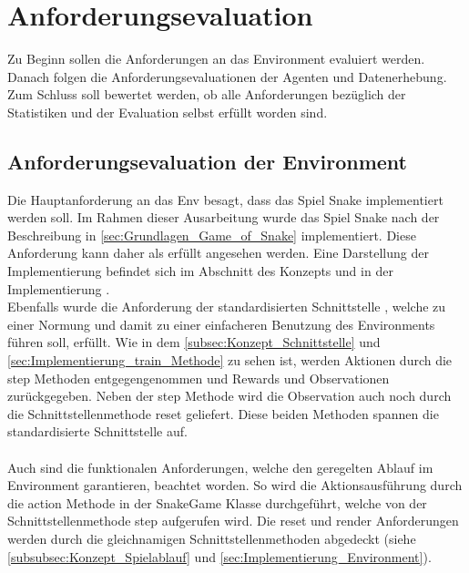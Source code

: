 \section{Anforderungsevaluation}
Zu Beginn sollen die Anforderungen an das Environment evaluiert werden. Danach folgen die Anforderungsevaluationen der Agenten und Datenerhebung. Zum Schluss soll bewertet werden, ob alle Anforderungen bezüglich der Statistiken und der Evaluation selbst erfüllt worden sind.

\subsection{Anforderungsevaluation der Environment}
Die Hauptanforderung an das Env besagt, dass das Spiel Snake implementiert werden soll. Im Rahmen dieser Ausarbeitung wurde das Spiel Snake nach der Beschreibung in \autoref{sec:Grundlagen_Game_of_Snake} implementiert. Diese Anforderung kann daher als erfüllt angesehen werden. Eine Darstellung der Implementierung befindet sich im Abschnitt des Konzepts  und in der Implementierung .\\
Ebenfalls wurde die Anforderung der standardisierten Schnittstelle , welche zu einer Normung und damit zu einer einfacheren Benutzung des Environments führen soll, erfüllt. Wie in dem \autoref{subsec:Konzept_Schnittstelle} und \autoref{sec:Implementierung_train_Methode} zu sehen ist, werden Aktionen durch die step Methoden entgegengenommen und Rewards und Observationen zurückgegeben. Neben der step Methode wird die Observation auch noch durch die Schnittstellenmethode reset geliefert. Diese beiden Methoden spannen die standardisierte Schnittstelle auf.\\
\\Auch sind die funktionalen Anforderungen, welche den geregelten Ablauf im Environment garantieren, beachtet worden.
So wird die Aktionsausführung   durch die action Methode in der SnakeGame Klasse durchgeführt, welche von der Schnittstellenmethode step aufgerufen wird. Die reset und render Anforderungen werden durch die gleichnamigen Schnittstellenmethoden abgedeckt (siehe \autoref{subsubsec:Konzept_Spielablauf} und \autoref{sec:Implementierung_Environment}).

